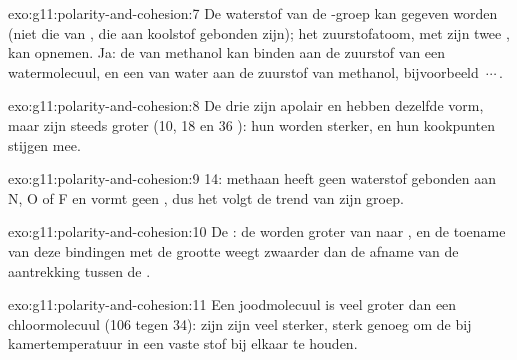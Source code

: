 \begin{solution}{exo:g11:polarity-and-cohesion:7}
De waterstof van de -groep kan gegeven worden (niet die van
, die aan koolstof gebonden zijn); het zuurstofatoom, met zijn
twee , kan opnemen. Ja: de  van methanol kan
binden aan de zuurstof van een watermolecuul, en een  van water
aan de zuurstof van methanol, bijvoorbeeld
\,$\cdots$\,.
\end{solution}

\begin{solution}{exo:g11:polarity-and-cohesion:8}
De drie  zijn apolair en hebben dezelfde vorm, maar zijn steeds
groter (10, 18 en 36 ): hun  worden
sterker, en hun kookpunten stijgen mee.
\end{solution}

\begin{solution}{exo:g11:polarity-and-cohesion:9}
 14: methaan heeft geen waterstof gebonden aan N, O of F en vormt
geen , dus het volgt de trend van zijn groep.
\end{solution}

\begin{solution}{exo:g11:polarity-and-cohesion:10}
De : de  worden groter van  naar
, en de toename van deze bindingen met de grootte weegt zwaarder
dan de afname van de aantrekking tussen de .
\end{solution}

\begin{solution}{exo:g11:polarity-and-cohesion:11}
Een joodmolecuul is veel groter dan een chloormolecuul (106 
tegen 34): zijn  zijn veel sterker, sterk genoeg om
de  bij kamertemperatuur in een vaste stof bij elkaar te
houden.
\end{solution}

